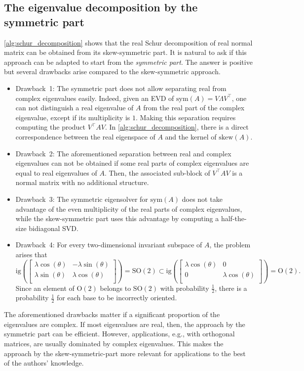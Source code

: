 \documentclass[10pt,twoside,dvipsnames]{siamart1116}
\numberwithin{algorithm}{section}
\numberwithin{equation}{section}
\newcommand{\new}[1]{#1}
\begin{document}
	\new{
	\subsection{The eigenvalue decomposition by the symmetric part} \cref{alg:schur_decomposition} shows that the real Schur decomposition of real normal matrix can be obtained from its skew-symmetric part. It is natural to ask if this approach can be adapted to start from the \emph{symmetric part}. The answer is positive but several drawbacks arise compared to the skew-symmetric approach.
	\begin{itemize}
		\item Drawback~1: The symmetric part does not allow separating real from complex eigenvalues easily. Indeed, given an EVD of $\mathrm{sym}(A)= V\Lambda V^\top $, one can not distinguish a real eigenvalue of $A$ from the real part of the complex eigenvalue, except if its multiplicity is $1$. Making this separation requires computing the product $V^\top A V$. In \cref{alg:schur_decomposition}, there is a direct correspondence between the real eigenspace of $A$ and the kernel of $\mathrm{skew}(A)$.
		\item Drawback~2: The aforementioned separation between real and complex eigenvalues can not be obtained if some real parts of complex eigenvalues are equal to real eigenvalues of $A$. Then, the associated sub-block of  $V^\top A V$ is a normal matrix with no additional structure. 
		\item Drawback~3: The symmetric eigensolver for $\mathrm{sym}(A)$ does not take advantage of the even multiplicity of the real parts of complex eigenvalues, while the skew-symmetric part uses this advantage by computing a half-the-size bidiagonal SVD.
		\item Drawback~4: For every two-dimensional invariant subspace of $A$, the problem arises that
		\begin{equation*}
			\mathrm{ig}\left(\begin{bmatrix}
			\lambda \cos(\theta)&-\lambda\sin(\theta)\\
			\lambda \sin(\theta)&\lambda\cos(\theta)\\
			\end{bmatrix}\right) =\mathrm{SO}(2)\subset \mathrm{ig}\left(\begin{bmatrix}
			\lambda \cos(\theta)&0\\
			0&\lambda\cos(\theta)\\
			\end{bmatrix}\right) =\mathrm{O}(2).
		\end{equation*}
		Since an element of $\mathrm{O}(2)$ belongs to $\mathrm{SO}(2)$ with probability $\frac12$, there is a probability $\frac12$ for each base to be incorrectly oriented.
	\end{itemize}
	The aforementioned drawbacks matter if a significant proportion of the eigenvalues are complex. If most eigenvalues are real, then, the approach by the symmetric part can be efficient. However, applications, e.g., with orthogonal matrices, are usually dominated by complex eigenvalues. This makes the approach by the skew-symmetric-part more relevant for applications to the best of the authors' knowledge.}
	 
\end{document}
